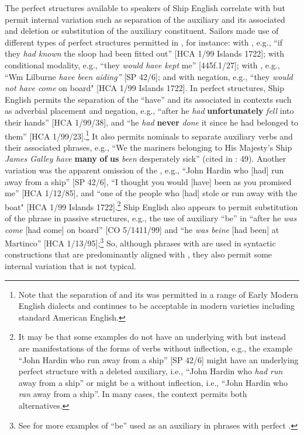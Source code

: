 The perfect structures available to speakers of Ship English correlate with  but permit internal variation such as separation of the auxiliary and its associated  and deletion or substitution of the auxiliary constituent. Sailors made use of different types of perfect structures permitted in , for instance:  with , e.g., “if they \textit{had known} the sloop had been fitted out” [HCA 1/99  Islands 1722];  with conditional modality, e.g., “they \textit{would have kept} me” [445f.1/27];  with , e.g., “Wm Lilburne \textit{have been aiding”} [SP 42/6]; and  with negation, e.g., “they \textit{would not have come} on board" [HCA 1/99  Islands 1722]. In perfect structures, Ship English permits the separation of the  “have” and its associated   in contexts such as adverbial placement and negation, e.g., “after he \textit{had} \textbf{unfortunately} \textit{fell} into their hands” [HCA 1/99/38], and “he \textit{had} \textbf{never} \textit{done} it since he had belonged to them” [HCA 1/99/23].\footnote{Note that the separation of  and its   was permitted in a range of Early Modern English dialects and continues to be acceptable in modern varieties including standard American English.} It also permits nominals to separate auxiliary verbs and their associated   phrases, e.g., “We the mariners belonging to His Majesty’s Ship \textit{James Galley have} \textbf{many} \textbf{of} \textbf{us} \textit{been} desperately sick” (cited in \citealt{Brown2011}: 49). Another variation was the apparent omission of the , e.g., “John Hardin who [had] run away from a ship” [SP 42/6], “I thought you would [have] been as you promised me” [HCA 1/12/85], and “one of the people who [had] stole or run away with the boat" [HCA 1/99  Islands 1722].\footnote{It may be that some examples do not have an underlying  with  but instead are manifestations of the  forms of verbs without  inflection, e.g., the example “John Hardin who run away from a ship” [SP 42/6] might have an underlying perfect structure with a deleted auxiliary, i.e., “John Hardin who \textit{had run} away from a ship” or might be a   without inflection, i.e., “John Hardin who \textit{ran} away from a ship”. In many cases, the context permits both alternatives.}  Ship English also appears to permit substitution of the  phrase in passive structures, e.g., the use of auxiliary “be” in “after he \textit{was come} [had come] on board” [CO 5/1411/99] and “he \textit{was beine} [had been] at Martinco” [HCA 1/13/95];\footnote{See  for more examples of “be” used as an auxiliary in  phrases with perfect .}  So, although  phrases with  are used in syntactic constructions that are predominantly aligned with , they also permit some internal variation that is not typical. 

